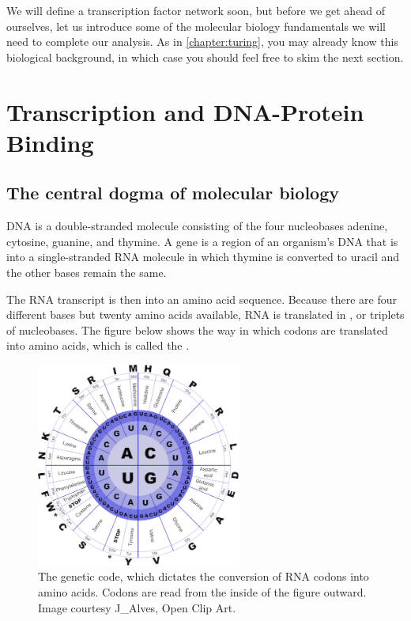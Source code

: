 We will define a transcription factor network soon, but before we get ahead of ourselves, let us introduce some of the molecular biology fundamentals we will need to complete our analysis. As in \autoref{chapter:turing}, you may already know this biological background, in which case you should feel free to skim the next section.

\FloatBarrier
{}

\section{Transcription and DNA-Protein Binding}
\label{sec:transcription_and_dna-protein_binding}

\subsection{The central dogma of molecular biology}

DNA is a double-stranded molecule consisting of the four nucleobases adenine, cytosine, guanine, and thymine. A gene is a region of an organism's DNA that is  into a single-stranded RNA molecule in which thymine is converted to uracil and the other bases remain the same.

The RNA transcript is then  into an amino acid sequence. Because there are four different bases but twenty amino acids available, RNA is translated in , or triplets of nucleobases. The figure below shows the way in which codons are translated into amino acids, which is called the .

\begin{figure}[h]
\centering
\mySfFamily
\includegraphics[width = 0.6\textwidth]{../assets/images/600px/genetic_code.png}
\caption{The genetic code, which dictates the conversion of RNA codons into amino acids. Codons are read from the inside of the figure outward. Image courtesy J_Alves, Open Clip Art.}
\label{fig:genetic_code}
\end{figure}

